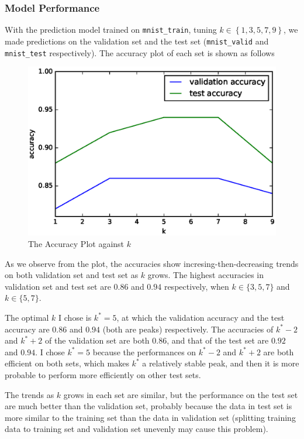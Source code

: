 \documentclass[10pt]{article}
\begin{document}
\subsubsection{Model Performance}
With the prediction model trained on \texttt{mnist\_train}, tuning $k \in \left\{1, 3, 5, 7, 9\right\}$, we made predictions on the validation set and the test set (\texttt{mnist\_valid} and \texttt{mnist\_test} respectively). The accuracy plot of each set is shown as follows
\begin{figure}[H]
\centering
\includegraphics[scale=.65]{plot1.eps}
\caption{The Accuracy Plot against $k$}
\label{plot1}
\end{figure}
As we observe from the plot, the accuracies show incresing-then-decreasing trends on both validation set and test set as $k$ grows. The highest accuracies in validation set and test set are $0.86$ and $0.94$ respectively, when $k \in \{3, 5, 7\}$ and $k \in \{5, 7\}$.\par
The optimal $k$ I chose is $k^* = 5$, at which the validation accuracy and the test accuracy are $0.86$ and $0.94$ (both are peaks) respectively. The accuracies of $k^* - 2$ and $k^* + 2$ of the validation set are both $0.86$, and that of the test set are $0.92$ and $0.94$. I chose $k^* = 5$ because the performances on $k^* - 2$ and $k^* + 2$ are both efficient on both sets, which makes $k^*$ a relatively stable peak, and then it is more probable to perform more efficiently on other test sets.\par
The trends as $k$ grows in each set are similar, but the performance on the test set are much better than the validation set, probably because the data in test set is more similar to the training set than the data in validation set (splitting training data to training set and validation set unevenly may cause this problem).
\end{document}

